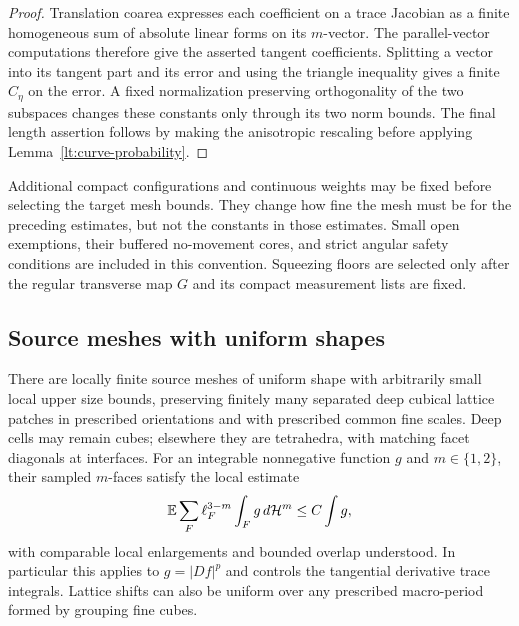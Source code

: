 \begin{proof}
Translation coarea expresses each coefficient on a trace
Jacobian as a finite homogeneous sum of absolute linear forms
on its $m$-vector.  The parallel-vector computations therefore
give the asserted tangent coefficients.  Splitting a vector
into its tangent part and its error and using the triangle
inequality gives a finite $C_\eta$ on the error.  A fixed
normalization preserving orthogonality of the two subspaces
changes these constants only through its two norm bounds.
The final length assertion follows by making the anisotropic
rescaling before applying Lemma~\ref{lt:curve-probability}.
\end{proof}

\begin{remark}
\label{lt:weighted-order}
Additional compact configurations and continuous weights may be
fixed before selecting the target mesh bounds.  They change how
fine the mesh must be for the preceding estimates, but not the
constants in those estimates.  Small open exemptions, their
buffered no-movement cores, and strict angular safety conditions
are included in this convention.  Squeezing floors are selected
only after the regular transverse map $G$ and its compact
measurement lists are fixed.
\end{remark}

\subsection{Source meshes with uniform shapes}

\begin{lemma}
\label{lt:source-mesh}
There are locally finite source meshes of uniform shape with
arbitrarily small local upper size bounds, preserving finitely
many separated deep cubical lattice patches in prescribed
orientations and with prescribed common fine scales.  Deep
cells may remain cubes; elsewhere they are tetrahedra, with
matching facet diagonals at interfaces.  For an integrable
nonnegative function $g$ and $m\in\{1,2\}$, their sampled
$m$-faces satisfy the local estimate
\begin{equation}
 \mathbb E\sum_F \ell_F^{3-m}\int_F g\,d\mathcal H^m
                    \leq C\int g,
 \label{lt:source-fubini}
\end{equation}
with comparable local enlargements and bounded overlap understood.
In particular this applies to $g=|Df|^p$ and controls the
tangential derivative trace integrals.  Lattice shifts can also
be uniform over any prescribed macro-period formed by grouping
fine cubes.
\end{lemma}

